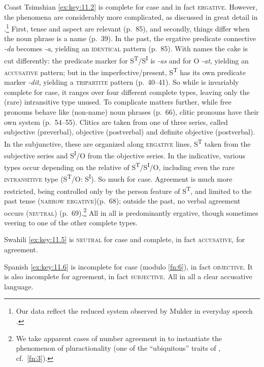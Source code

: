 \documentclass[output=paper]{langsci/langscibook}
\begin{document}
\largerpage[2]
Coast Tsimshian \eqref{ex:key:11.2} is complete for case and in fact
\textsc{ergative}.  However, the phenomena are considerably more complicated,
as discussed in great detail in \citet{Mulder1994}.\footnote{Our data reflect
    the reduced system observed by Mulder in everyday speech
\citep[39]{Mulder1994}.} First, tense and aspect are relevant (p.\ 85), and
secondly, things differ when the noun phrase is a name (p.\ 39). In the past,
the ergative predicate connective \emph{-da} becomes \emph{-a}, yielding an
\textsc{identical} pattern (p.\ 85). With names the cake is cut differently:
the predicate marker for S\textsuperscript{T}/S\textsuperscript{I} is
\emph{-as} and for O \emph{-at}, yielding an \textsc{accusative} pattern; but
in the imperfective/present, S\textsuperscript{T} has its own predicate marker
\emph{-dit}, yielding a \textsc{tripartite} pattern (p.\ 40--41). So while
 is invariably complete for case, it ranges over four
different complete types, leaving only the (rare) intransitive type unused. To
complicate matters further, while free pronouns behave like (non-name) noun
phrases (p.\ 66), clitic pronouns have their own system (p.\ 54--55). Clitics
are taken from one of three series, called subjective (preverbal), objective
(postverbal) and definite objective (postverbal). In the subjunctive, these are
organized along \textsc{ergative} lines, S\textsuperscript{T} taken from the
subjective series and S\textsuperscript{I}/O from the objective series. In the
indicative, various types occur depending on the relative  of
S\textsuperscript{T}/S\textsuperscript{I}/O, including even the rare
\textsc{intransitive} type (S\textsuperscript{T}/O: S\textsuperscript{I}). So
much for  case. Agreement is much more restricted, being
controlled only by the person feature of S\textsuperscript{T}, and limited to
the past tense (\textsc{narrow ergative})(p.\ 68); outside the past, no verbal
agreement occurs (\textsc{neutral}) (p.\ 69).\footnote{We take apparent cases of
    number agreement in  to instantiate the phenomenon of
pluractionality (one of the \enquote{ubiquitous}  traits of
\citealt{Queixalos2013}, cf.\ \cref{fn:3}).} All in all 
is predominantly ergative, though sometimes veering to one of the other
complete types.

Swahili \eqref{ex:key:11.5} is \textsc{neutral} for case and complete, in fact
\textsc{accusative}, for agreement.

Spanish \eqref{ex:key:11.6} is incomplete for case (modulo \cref{fn:6}), in fact \textsc{objective}.
It is also incomplete for agreement, in fact \textsc{subjective}. All in all a
clear accusative language.
\end{document}
